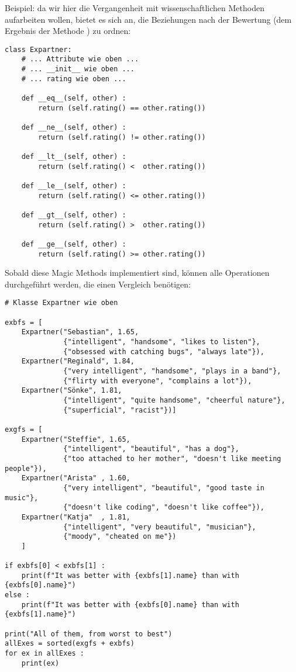 Beispiel: da wir hier die Vergangenheit mit wissenschaftlichen Methoden aufarbeiten wollen, bietet es sich an, die Beziehungen nach der Bewertung (dem Ergebnis der Methode ) zu ordnen:

\begin{codebox}
\begin{verbatim}
class Expartner:
    # ... Attribute wie oben ...
    # ... __init__ wie oben ...
    # ... rating wie oben ...
    
    def __eq__(self, other) :
        return (self.rating() == other.rating())
    
    def __ne__(self, other) :
        return (self.rating() != other.rating())
    
    def __lt__(self, other) :
        return (self.rating() <  other.rating())
    
    def __le__(self, other) :
        return (self.rating() <= other.rating())
    
    def __gt__(self, other) :
        return (self.rating() >  other.rating())
    
    def __ge__(self, other) :
        return (self.rating() >= other.rating())
\end{verbatim}
\end{codebox}

Sobald diese Magic Methods implementiert sind, können alle Operationen durchgeführt werden, die einen Vergleich benötigen:

\begin{codebox}
\begin{verbatim}
# Klasse Expartner wie oben

exbfs = [
    Expartner("Sebastian", 1.65,
              {"intelligent", "handsome", "likes to listen"},
              {"obsessed with catching bugs", "always late"}),
    Expartner("Reginald", 1.84,
              {"very intelligent", "handsome", "plays in a band"},
              {"flirty with everyone", "complains a lot"}),
    Expartner("Sönke", 1.81,
              {"intelligent", "quite handsome", "cheerful nature"},
              {"superficial", "racist"})]

exgfs = [
    Expartner("Steffie", 1.65, 
              {"intelligent", "beautiful", "has a dog"},
              {"too attached to her mother", "doesn't like meeting people"}),
    Expartner("Arista" , 1.60,
              {"very intelligent", "beautiful", "good taste in music"},
              {"doesn't like coding", "doesn't like coffee"}),
    Expartner("Katja"  , 1.81,
              {"intelligent", "very beautiful", "musician"},
              {"moody", "cheated on me"})
    ]

if exbfs[0] < exbfs[1] :
    print(f"It was better with {exbfs[1].name} than with {exbfs[0].name}")
else :
    print(f"It was better with {exbfs[0].name} than with {exbfs[1].name}")

print("All of them, from worst to best")
allExes = sorted(exgfs + exbfs)
for ex in allExes :
    print(ex)
\end{verbatim}
\end{codebox}

